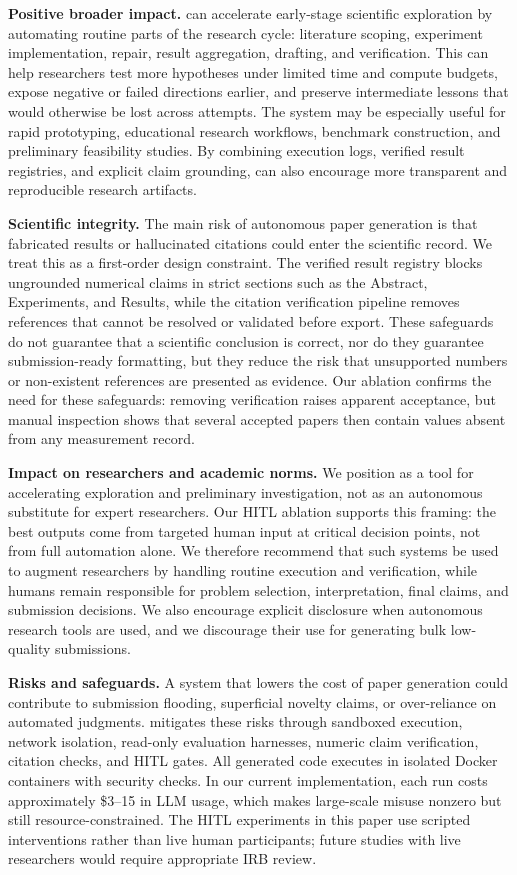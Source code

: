 \noindent \textbf{Positive broader impact.}
\system{} can accelerate early-stage scientific exploration by automating routine parts of the research cycle: literature scoping, experiment implementation, repair, result aggregation, drafting, and verification. This can help researchers test more hypotheses under limited time and compute budgets, expose negative or failed directions earlier, and preserve intermediate lessons that would otherwise be lost across attempts. The system may be especially useful for rapid prototyping, educational research workflows, benchmark construction, and preliminary feasibility studies. By combining execution logs, verified result registries, and explicit claim grounding, \system{} can also encourage more transparent and reproducible research artifacts.

\noindent \textbf{Scientific integrity.}
The main risk of autonomous paper generation is that fabricated results or hallucinated citations could enter the scientific record. We treat this as a first-order design constraint. The verified result registry blocks ungrounded numerical claims in strict sections such as the Abstract, Experiments, and Results, while the citation verification pipeline removes references that cannot be resolved or validated before export. These safeguards do not guarantee that a scientific conclusion is correct, nor do they guarantee submission-ready formatting, but they reduce the risk that unsupported numbers or non-existent references are presented as evidence. Our ablation confirms the need for these safeguards: removing verification raises apparent acceptance, but manual inspection shows that several accepted papers then contain values absent from any measurement record.

\noindent \textbf{Impact on researchers and academic norms.}
We position \system{} as a tool for accelerating exploration and preliminary investigation, not as an autonomous substitute for expert researchers. Our HITL ablation supports this framing: the best outputs come from targeted human input at critical decision points, not from full automation alone. We therefore recommend that such systems be used to augment researchers by handling routine execution and verification, while humans remain responsible for problem selection, interpretation, final claims, and submission decisions. We also encourage explicit disclosure when autonomous research tools are used, and we discourage their use for generating bulk low-quality submissions.

\noindent \textbf{Risks and safeguards.}
A system that lowers the cost of paper generation could contribute to submission flooding, superficial novelty claims, or over-reliance on automated judgments. \system{} mitigates these risks through sandboxed execution, network isolation, read-only evaluation harnesses, numeric claim verification, citation checks, and HITL gates. All generated code executes in isolated Docker containers with security checks. In our current implementation, each run costs approximately \$3--15 in LLM usage, which makes large-scale misuse nonzero but still resource-constrained. The HITL experiments in this paper use scripted interventions rather than live human participants; future studies with live researchers would require appropriate IRB review.

